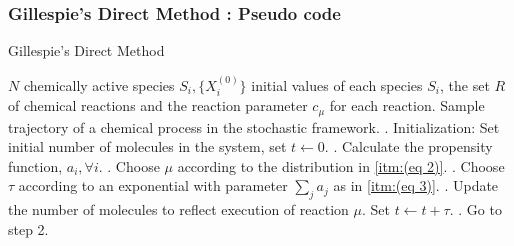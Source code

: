\documentclass[11pt,a4paper]{article}
\begin{document}
\subsubsection{Gillespie's Direct Method : Pseudo code}
\begin{algorithm}[!h]                     %
\caption{Gillespie's Direct Method}       %
\begin{algorithmic}                       %
\REQUIRE $N$ chemically active species $S_i, \{X_{i}^{(0)}\}$ initial values of each species $S_i$, the set $R$ \hspace*{8mm} of chemical reactions and the reaction parameter $c_{\mu}$ for each reaction.
\ENSURE Sample trajectory of a chemical process in the stochastic framework.
    . Initialization: Set initial number of molecules in the system, set $t \leftarrow 0$.
    . Calculate the propensity function, $a_{i},  \forall i$.
    . Choose $\mu$ according to the distribution in \ref{itm:(eq 2)}.
    . Choose $\tau$ according to an exponential with parameter $\sum_{j}a_{j}$ as in \ref{itm:(eq 3)}.
    . Update the number of molecules to reflect execution of reaction $\mu$. Set $t \leftarrow t + \tau$.
    . Go to step 2.
\ENDWHILE
\end{algorithmic}
\label{alg:Gillespie's Direct Method}
\end{algorithm}
\end{document}
